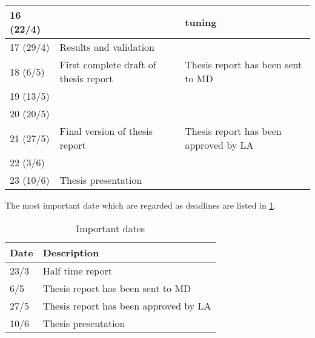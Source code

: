 \begin{table}[H]
\begin{tabular}{|p{}|p{}|p{}|}
	16 (22/4)            &                                         & tuning                                                                                                                                \\ \hline
	17 (29/4)            & Results and validation                  &  \\ \hline
	18 (6/5)             & First complete draft of thesis report   & Thesis report has been sent to MD                                                                                                     \\ \hline
	19 (13/5)            &                                         &  \\ \hline
	20 (20/5)            &                                         &  \\ \hline
	21 (27/5)            & Final version of thesis report          & Thesis report has been approved by LA                                                                                                 \\ \hline
	22 (3/6)             &                                         &  \\ \hline
	23 (10/6)            & Thesis presentation                     &  \\ \hline
\end{tabular}
\end{table}

The most important date which are regarded as deadlines are listed in \cref{table:dates}.


\begin{table}[H]
	\centering
	\caption{Important dates}
	\label{table:dates}
	\begin{tabular}{|p{}|p{}|}
		\hline
		\textbf{Date} & \textbf{Description}                  \\ \hline
		23/3          & Half time report                      \\ \hline
		6/5          & Thesis report has been sent to MD     \\ \hline
		27/5          & Thesis report has been approved by LA \\ \hline
		10/6          & Thesis presentation                   \\ \hline
	\end{tabular}
\end{table}


